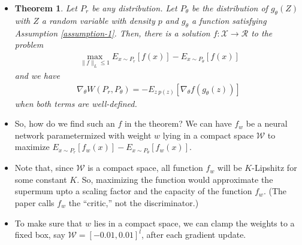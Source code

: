 \documentclass[10pt]{article}
\newtheorem{theorem}[lemma]{Theorem}
\begin{document}
\begin{itemize}
  	\item \begin{theorem}
  		Let $P_r$ be any distribution. Let $P_\theta$ be the distribution of $g_\theta(Z)$ with $Z$ a random variable with density $p$ and $g_\theta$ a function satisfying Assumption \ref{assumption-1}. Then, there is a solution $f: \mathcal{X} \rightarrow \mathcal{R}$ to the problem
  		\begin{align*}
  			\max_{\| f\|_L \leq 1} E_{x \sim P_r} [f(x)] - E_{x \sim P_\theta} [f(x)]
  		\end{align*}
  		and we have 
  		\begin{align*}
  			\nabla_\theta W(P_r, P_\theta) 
  			= - E_{z~p(z)} [\nabla_\theta f(g_\theta(z))]  			
  		\end{align*}
  		when both terms are well-defined.
  	\end{theorem}

  	\item So, how do we find such an $f$ in the theorem? We can have $f_w$ be a neural network parametermized with weight $w$ lying in a compact space $\mathcal{W}$ to maximize $E_{x \sim P_r} [f_w(x)] - E_{x \sim P_\theta} [f_w(x)]$.

  	\item Note that, since $\mathcal{W}$ is a compact space, all function $f_w$ will be $K$-Lipshitz for some constant $K$. So, maximizing the function would approximate the supermum upto a scaling factor and the capacity of the function $f_w$. (The paper calls $f_w$ the ``critic,'' not the discriminator.)

  	\item To make sure that $w$ lies in a compact space, we can clamp the weights to a fixed box, say $\mathcal{W} = [-0.01,0.01]^l$, after each gradient update.


\end{itemize}
\end{document}
